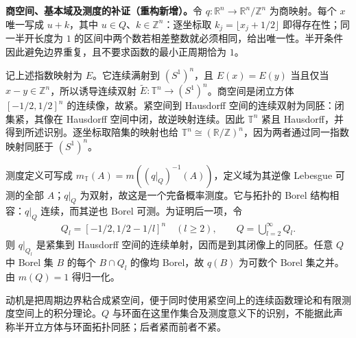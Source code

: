 \documentclass[../../main.tex]{subfiles}
\begin{document}
\begin{remark}
\textbf{商空间、基本域及测度的补证（重构新增）。}令 $q:\mathbb R^n\to\mathbb R^n/\mathbb Z^n$ 为商映射。每个 $x$ 唯一写成 $u+k$，其中 $u\in Q$、$k\in\mathbb Z^n$：逐坐标取 $k_j=\lfloor x_j+1/2\rfloor$ 即得存在性；同一半开长度为 $1$ 的区间中两个数若相差整数就必须相同，给出唯一性。半开条件因此避免边界重复，且不要求函数的最小正周期恰为 $1$。

记上述指数映射为 $E$。它连续满射到 $(S^1)^n$，且 $E(x)=E(y)$ 当且仅当 $x-y\in\mathbb Z^n$，所以诱导连续双射 $\widetilde E:\mathbb T^n\to(S^1)^n$。商空间是闭立方体 $[-1/2,1/2]^n$ 的连续像，故紧。紧空间到 Hausdorff 空间的连续双射为同胚：闭集紧，其像在 Hausdorff 空间中闭，故逆映射连续。因此 $\mathbb T^n$ 紧且 Hausdorff，并得到所述识别。逐坐标取陪集的映射也给 $\mathbb T^n\cong(\mathbb R/\mathbb Z)^n$，因为两者通过同一指数映射同胚于 $(S^1)^n$。

测度定义可写成 $m_{\mathbb T}(A)=m((q|_Q)^{-1}(A))$，定义域为其逆像 Lebesgue 可测的全部 $A$；$q|_Q$ 为双射，故这是一个完备概率测度。它与拓扑的 Borel 结构相容：$q|_Q$ 连续，而其逆也 Borel 可测。为证明后一项，令
\begin{align*}
Q_l=[-1/2,1/2-1/l]^n\quad(l\geqslant2),\qquad Q=\bigcup_{l=2}^\infty Q_l.
\end{align*}
则 $q|_{Q_l}$ 是紧集到 Hausdorff 空间的连续单射，因而是到其闭像上的同胚。任意 $Q$ 中 Borel 集 $B$ 的每个 $B\cap Q_l$ 的像均 Borel，故 $q(B)$ 为可数个 Borel 集之并。由 $m(Q)=1$ 得归一化。

动机是把周期边界粘合成紧空间，便于同时使用紧空间上的连续函数理论和有限测度空间上的积分理论。$Q$ 与环面在这里作集合及测度意义下的识别，不能据此声称半开立方体与环面拓扑同胚；后者紧而前者不紧。
\end{remark}

\end{document}

